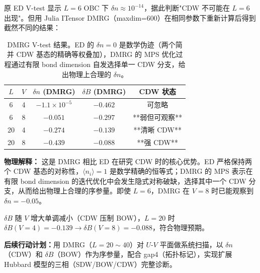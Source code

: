 \documentclass[11pt,a4paper]{article}
\begin{document}
原 ED V-test 显示 $L=6$ OBC 下 $\delta n\approx 10^{-14}$，据此判断"CDW 不可能在 $L=6$ 出现"。但用 Julia ITensor DMRG（maxdim=600）在相同参数下重新计算后得到截然不同的结果：

\begin{table}[ht]
\centering
\begin{tabular}{c|c|c|c|c}
\toprule
$L$ & $V$ & $\delta n$ (DMRG) & $\delta B$ (DMRG) & CDW 状态 \\
\midrule
6  & 4 & $-1.1\times10^{-5}$ & $-0.462$ & 可忽略 \\
6  & 8 & $-0.051$            & $-0.297$ & **弱但可观察** \\
20 & 4 & $-0.274$            & $-0.139$ & **清晰 CDW** \\
20 & 8 & $-0.439$            & $-0.088$ & **强 CDW** \\
\bottomrule
\end{tabular}
\caption{DMRG V-test 结果。ED 的 $\delta n=0$ 是数学伪迹（两个简并 CDW 基态的精确等权叠加），DMRG 的 MPS 优化过程通过有限 bond dimension 自发选择单一 CDW 分支，给出物理上合理的 $\delta n$。}\label{tab:dmrg_vtest}
\end{table}

\textbf{物理解释：} 这是 DMRG 相比 ED 在研究 CDW 时的核心优势。ED 严格保持两个 CDW 基态的对称性，$\langle n_i\rangle=1$ 是数学精确的恒等式；DMRG 的 MPS 表示在有限 bond dimension 的迭代优化中会发生隐式对称破缺，选择其中一个 CDW 分支，从而给出物理上合理的序参量。即使 $L=6$，DMRG 在 $V=8$ 时已能观察到 $\delta n=-0.05$。

$\delta B$ 随 $V$ 增大单调减小（CDW 压制 BOW），$L=20$ 时 $\delta B(V=4)=-0.139 \to \delta B(V=8)=-0.088$，符合物理预期。

\textbf{后续行动计划：}用 DMRG（$L=20\sim40$）对 $U$-$V$ 平面做系统扫描，以 $\delta n$（CDW）和 $\delta B$（BOW）作为序参量，配合 gap4（拓扑标记），实现扩展 Hubbard 模型的三相（SDW/BOW/CDW）完整诊断。
\end{document}
